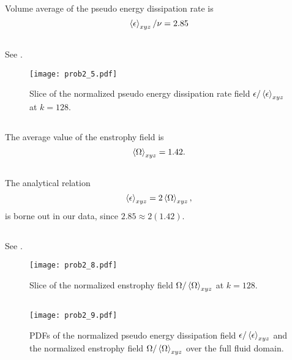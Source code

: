 \documentclass[11pt]{article}
\begin{document}
Volume average of the pseudo energy dissipation rate is
\[
\left< \epsilon \right>_{xyz}/\nu = 2.85
\]

\subsection{}

See .

\begin{figure}[t]
\centering
\texttt{[image: prob2\_5.pdf]}
\\[6pt]
\caption{Slice of the normalized pseudo energy dissipation rate field $\epsilon / \left< \epsilon \right>_{xyz}$ at $k=128$.}
\label{fig:prob_2_5_epsilon_normalized_slice}
\end{figure}

\subsection{}

The average value of the enstrophy field is
\[
\left< \Omega \right>_{xyz} = 1.42
.
\]

\subsection{}

The analytical relation
\[
\left< \epsilon \right>_{xyz} = 2 \left< \Omega \right>_{xyz}
,
\]
is borne out in our data, since $2.85 \approx 2(1.42)$.

\subsection{}

See .

\begin{figure}[t]
\centering
\texttt{[image: prob2\_8.pdf]}
\\[6pt]
\caption{Slice of the normalized enstrophy field $\Omega / \left< \Omega \right>_{xyz}$ at $k=128$.}
\label{fig:prob_2_8_omega_normalized_slice}
\end{figure}

\subsection{}

\begin{figure}[t]
\centering
\texttt{[image: prob2\_9.pdf]}
\\[6pt]
\caption{PDFs of the normalized pseudo energy dissipation field $\epsilon / \left< \epsilon \right>_{xyz}$ and the normalized enstrophy field $\Omega / \left< \Omega \right>_{xyz}$ over the full fluid domain.}
\label{fig:prob_2_9_energy_and_enstrophy_PDFs}
\end{figure}
\end{document}

